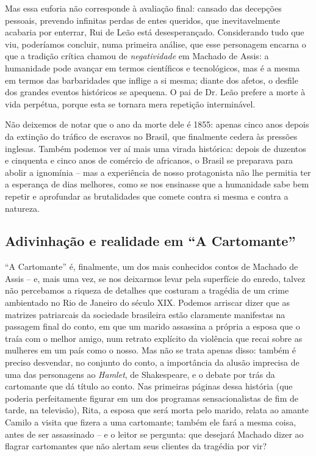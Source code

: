 \documentclass{extarticle}
\begin{document}
Mas essa euforia não corresponde à avaliação final: cansado das
decepções pessoais, prevendo infinitas perdas de entes queridos, que
inevitavelmente acabaria por enterrar, Rui de Leão está desesperançado.
Considerando tudo que viu, poderíamos concluir, numa primeira análise,
que esse personagem encarna o que a tradição crítica chamou de
\emph{negatividade} em Machado de Assis: a humanidade pode avançar em
termos científicos e tecnológicos, mas é a mesma em termos das
barbaridades que inflige a si mesma; diante dos afetos, o desfile dos
grandes eventos históricos se apequena. O pai de Dr. Leão prefere a
morte à vida perpétua, porque esta se tornara mera repetição
interminável.

Não deixemos de notar que o ano da morte dele é 1855: apenas cinco anos
depois da extinção do tráfico de escravos no Brasil, que finalmente
cedera às pressões inglesas. Também podemos ver aí mais uma virada
histórica: depois de duzentos e cinquenta e cinco anos de comércio de
africanos, o Brasil se preparava para abolir a ignomínia -- mas a
experiência de nosso protagonista não lhe permitia ter a esperança de
dias melhores, como se nos ensinasse que a humanidade sabe bem repetir e
aprofundar as brutalidades que comete contra si mesma e contra a
natureza.

\subsection{Adivinhação e realidade em ``A Cartomante''}

``A Cartomante'' é, finalmente, um dos mais conhecidos contos de Machado
de Assis -- e, mais uma vez, se nos deixarmos levar pela superfície do
enredo, talvez não percebamos a riqueza de detalhes que costuram a
tragédia de um crime ambientado no Rio de Janeiro do século XIX. Podemos
arriscar dizer que as matrizes patriarcais da sociedade brasileira estão
claramente manifestas na passagem final do conto, em que um marido
assassina a própria a esposa que o traía com o melhor amigo, num retrato
explícito da violência que recai sobre as mulheres em um país como o
nosso. Mas não se trata apenas disso: também é preciso desvendar, no
conjunto do conto, a importância da alusão imprecisa de uma das
personagens ao \emph{Hamlet}, de Shakespeare, e o debate por trás da
cartomante que dá título ao conto. Nas primeiras páginas dessa história
(que poderia perfeitamente figurar em um dos programas sensacionalistas
de fim de tarde, na televisão), Rita, a esposa que será morta pelo
marido, relata ao amante Camilo a visita que fizera a uma cartomante;
também ele fará a mesma coisa, antes de ser assassinado -- e o leitor se
pergunta: que desejará Machado dizer ao flagrar cartomantes que não
alertam seus clientes da tragédia por vir?
\end{document}
